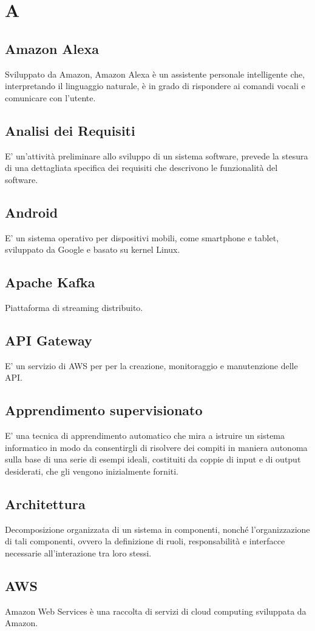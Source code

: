 \section*{A}

\subsection{Amazon Alexa}
Sviluppato da Amazon, Amazon Alexa è un assistente personale intelligente che, interpretando il linguaggio naturale, è in grado di rispondere ai comandi vocali e comunicare con l'utente. 

\subsection{Analisi dei Requisiti}
E' un'attività preliminare allo sviluppo di un sistema software, prevede la stesura di una dettagliata specifica dei requisiti che descrivono le funzionalità del software.

\subsection{Android}
E' un sistema operativo per dispositivi mobili, come smartphone e tablet, sviluppato da Google e basato su kernel Linux.

\subsection{Apache Kafka}
Piattaforma di streaming distribuito.

\subsection{API Gateway}
E' un servizio di AWS per per la creazione, monitoraggio e manutenzione delle API.

\subsection{Apprendimento supervisionato}
E' una tecnica di apprendimento automatico che mira a istruire un sistema informatico in modo da consentirgli di risolvere dei compiti in maniera autonoma sulla base di una serie di esempi ideali, costituiti da coppie di input e di output desiderati, che gli vengono inizialmente forniti.

\subsection{Architettura}
Decomposizione organizzata di un sistema in componenti, nonché l'organizzazione di tali componenti, ovvero la definizione di ruoli, responsabilità e interfacce necessarie all'interazione tra loro stessi.

\subsection{AWS}
Amazon Web Services è una raccolta di servizi di cloud computing sviluppata da Amazon.